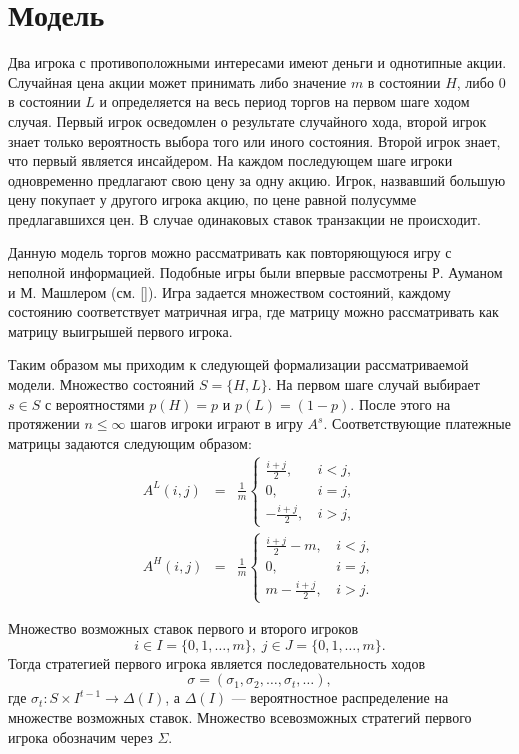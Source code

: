\section{Модель}
Два игрока с противоположными интересами имеют деньги и однотипные акции. Случайная цена акции может принимать либо значение $ m $ в состоянии $ H $, либо $ 0 $ в состоянии $ L $ и определяется на весь период торгов на первом шаге ходом случая. Первый игрок осведомлен о результате случайного хода, второй игрок знает только вероятность выбора того или иного состояния. 
Второй игрок знает, что первый является инсайдером.
На каждом последующем шаге игроки одновременно предлагают свою цену за одну акцию. Игрок, назвавший большую цену покупает у другого игрока акцию, по цене равной полусумме предлагавшихся цен. В случае одинаковых ставок транзакции не происходит.

Данную модель торгов можно рассматривать как повторяющуюся игру с неполной информацией. Подобные игры были впервые рассмотрены Р. Ауманом и М. Машлером (см. [\aumann]). Игра задается множеством состояний, каждому состоянию соответствует матричная игра, где матрицу можно рассматривать как матрицу выигрышей первого игрока.

Таким образом мы приходим к следующей формализации рассматриваемой модели.
Множество состояний $ S = \{H, L\} $. На первом шаге случай выбирает $ s \in S $ с вероятностями $ p(H) = p $ и $ p(L) = (1 - p) $.
После этого на протяжении $ n \leq \infty $ шагов игроки играют в игру $ A^s $.
Соответствующие платежные матрицы задаются следующим образом:
\begin{eqnarray*}
A^L(i, j) &=& \frac{1}{m}\begin{cases}
\frac{i+j}{2}, &\, i < j, \\
0, &\, i = j, \\
-\frac{i+j}{2}, &\, i > j,
\end{cases}
\\
A^H(i, j) &=& \frac{1}{m}\begin{cases}
\frac{i+j}{2} - m, &\, i < j, \\
0, &\, i = j, \\
m - \frac{i+j}{2}, &\, i > j.
\end{cases}
\end{eqnarray*}



Множество возможных ставок первого и второго игроков 
\[
  i \in I = \{0, 1, \ldots, m\}, \;
  j \in J = \{0, 1, \ldots, m\}.
\]
Тогда стратегией первого игрока является последовательность ходов
\[
  \sigma = (\sigma_1, \sigma_2, \ldots, \sigma_t, \ldots),
\]
где $ \sigma_t: S \times I^{t-1} \rightarrow \Delta(I) $, а $ \Delta(I) $ --- вероятностное распределение на множестве возможных ставок. Множество всевозможных стратегий первого игрока обозначим через $ \Sigma $.

